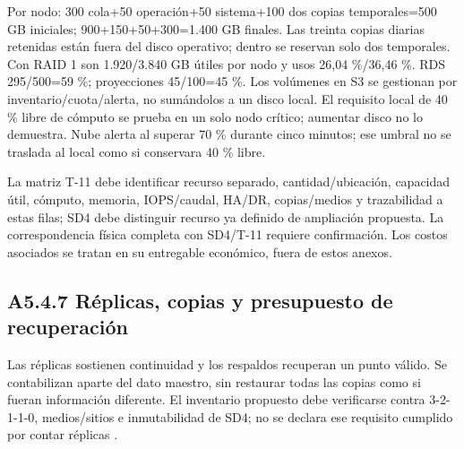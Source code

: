 Por nodo: 300 cola+50 operación+50 sistema+100 dos copias temporales=500 GB iniciales; 900+150+50+300=1.400 GB finales. Las treinta copias diarias retenidas están fuera del disco operativo; dentro se reservan solo dos temporales. Con RAID 1 son 1.920/3.840 GB útiles por nodo y usos 26,04 \%/36,46 \%. RDS 295/500=59 \%; proyecciones 45/100=45 \%. Los volúmenes en S3 se gestionan por inventario/cuota/alerta, no sumándolos a un disco local. El requisito local de 40 \% libre de cómputo se prueba en un solo nodo crítico; aumentar disco no lo demuestra. Nube alerta al superar 70 \% durante cinco minutos; ese umbral no se traslada al local como si conservara 40 \% libre.

La matriz T-11 debe identificar recurso separado, cantidad/ubicación, capacidad útil, cómputo, memoria, IOPS/caudal, HA/DR, copias/medios y trazabilidad a estas filas; SD4 debe distinguir recurso ya definido de ampliación propuesta. La correspondencia física completa con SD4/T-11 requiere confirmación. Los costos asociados se tratan en su entregable económico, fuera de estos anexos.

\subsection*{A5.4.7 Réplicas, copias y presupuesto de recuperación}

Las réplicas sostienen continuidad y los respaldos recuperan un punto válido. Se contabilizan aparte del dato maestro, sin restaurar todas las copias como si fueran información diferente. El inventario propuesto debe verificarse contra 3-2-1-1-0, medios/sitios e inmutabilidad de SD4; no se declara ese requisito cumplido por contar réplicas \parencite[RT-07.09]{pucv-bases-transversales}.


